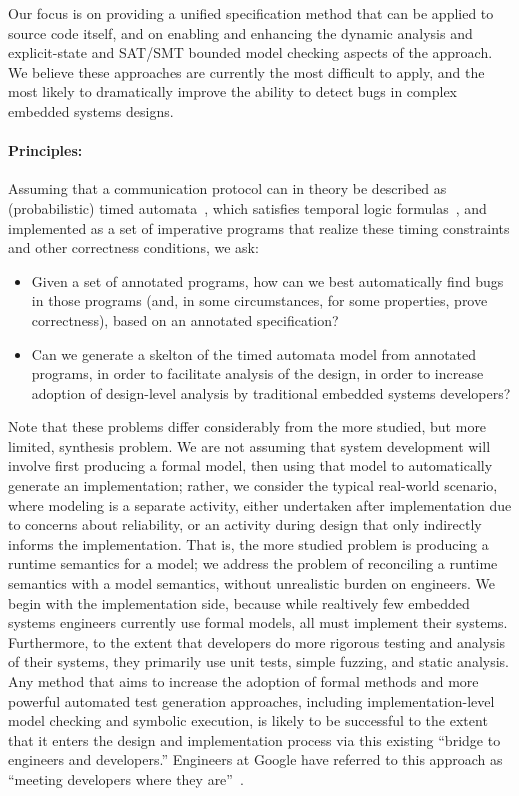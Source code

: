 Our focus is on providing a unified specification method that can be
applied to source code itself, and on enabling and enhancing the dynamic analysis and
explicit-state and SAT/SMT bounded model
checking aspects of the approach.  We believe these approaches are
currently the most difficult to apply, and the most likely to
dramatically improve the ability to detect bugs in complex embedded
systems designs.

\paragraph{Principles:} Assuming that a communication protocol can in theory be described
as (probabilistic) timed automata~\cite{AD1994:TCS},
which satisfies temporal logic
formulas~\cite{BLM2017:LNCS}, and implemented as a set of
imperative programs that realize these timing constraints and other
correctness conditions, we ask:
\begin{itemize}[labelsep=3pt,leftmargin=12pt]
\item Given a set of annotated programs, how can we best automatically
  find bugs in those programs (and, in some circumstances, for some
  properties, prove correctness), based on an annotated
  specification?
\item Can we generate a skelton of the timed automata model from 
  annotated programs, in order to facilitate analysis of the design, 
  in order to increase adoption of design-level analysis by 
  traditional embedded systems developers? 
\end{itemize}

Note that these problems differ considerably from the more studied,
but more limited, synthesis problem.  We are not assuming that
system development will involve first producing a formal model, then
using that model to automatically generate an implementation; rather,
we consider the typical real-world scenario, where modeling is a
separate activity, either undertaken after implementation due to
concerns about reliability, or an activity during design that only
indirectly informs the implementation.  That is, the more studied
problem is producing a runtime semantics for a model; we address the
problem of reconciling a runtime semantics with a model semantics,
without unrealistic burden on engineers.  We begin with the
implementation side, because while realtively few embedded systems
engineers currently use formal models, all must implement their
systems.  Furthermore, to the extent that developers do more rigorous
testing and analysis of their systems, they primarily use unit tests, simple
fuzzing, and static analysis.  Any method that aims to increase the
adoption of formal methods and more powerful automated test generation
approaches, including implementation-level model checking and symbolic
execution, is likely to be successful to the extent that it enters the
design and implementation process via this existing ``bridge to
engineers and developers.''  Engineers at Google have referred to this
approach as ``meeting developers where they are''~\cite{meeting}.


